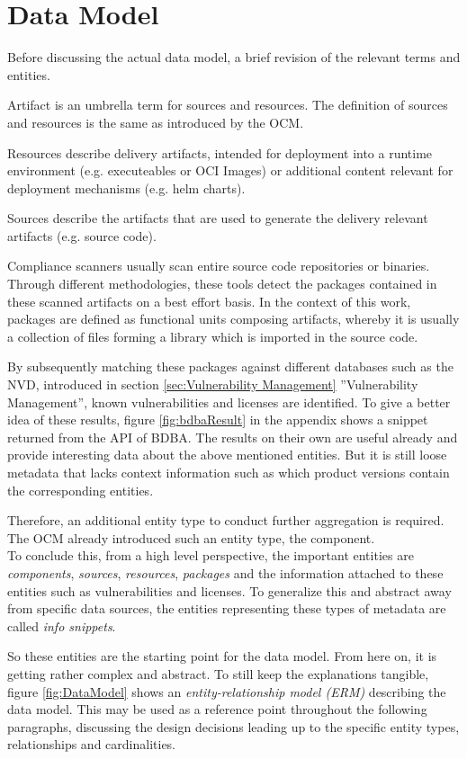 \section{Data Model} \label{sec:Data Model}
Before discussing the actual data model, a brief revision of the relevant terms and entities.\par Artifact is an umbrella term for sources and resources. The definition of sources and resources is the same as introduced by the OCM.\par 
Resources describe delivery artifacts, intended for deployment into a runtime environment (e.g. executeables or OCI Images) or additional content relevant for deployment mechanisms (e.g. helm charts).\par
Sources describe the artifacts that are used to generate the delivery relevant artifacts (e.g. source code).\par
Compliance scanners usually scan entire source code repositories or binaries. Through different methodologies, these tools detect the packages contained in these scanned artifacts on a best effort basis. In the context of this work, packages are defined as functional units composing artifacts, whereby it is usually a collection of files forming a library which is imported in the source code.\par
By subsequently matching these packages against different databases such as the NVD, introduced in section \ref{sec:Vulnerability Management} ''Vulnerability Management'', known vulnerabilities and licenses are identified. To give a better idea of these results, figure \ref{fig:bdbaResult} in the appendix shows a snippet returned from the API of BDBA. The results on their own are useful already and provide interesting data about the above mentioned entities. But it is still loose metadata that lacks context information such as which product versions contain the corresponding entities.\par
Therefore, an additional entity type to conduct further aggregation is required. The OCM already introduced such an entity type, the component.\\

To conclude this, from a high level perspective, the important entities are \emph{components}, \emph{sources}, \emph{resources}, \emph{packages} and the information attached to these entities such as vulnerabilities and licenses. To generalize this and abstract away from specific data sources, the entities representing these types of metadata are called \emph{info snippets}.\par
So these entities are the starting point for the data model. From here on, it is getting rather complex and abstract. To still keep the explanations tangible, figure \ref{fig:DataModel} shows an \emph{entity-relationship model (ERM)} describing the data model. This may be used as a reference point throughout the following paragraphs, discussing the design decisions leading up to the specific entity types, relationships and cardinalities.

